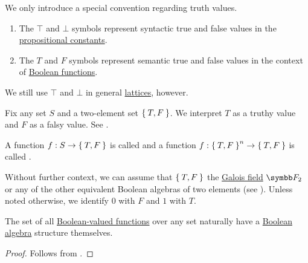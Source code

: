 \begin{remark}
  We only introduce a special convention regarding truth values.
  \begin{enumerate}
    \item The \( \top \) and \( \bot \) symbols represent syntactic true and false values in the \hyperref[def:propositional_alphabet/constants]{propositional constants}.
    \item The \( T \) and \( F \) symbols represent semantic true and false values in the context of \hyperref[def:boolean_function]{Boolean functions}.
  \end{enumerate}

  We still use \( \top \) and \( \bot \) in general \hyperref[def:lattice]{lattices}, however.
\end{remark}

\begin{definition}\label{def:boolean_function}
  Fix any set \( S \) and a two-element set \( \Set{ T, F } \). We interpret \( T \) as a truthy value and \( F \) as a falsy value. See .

  A function \( f: S \to \Set{ T, F } \) is called  and a function \( f: \Set{ T, F }^n \to \Set{ T, F } \) is called .

  Without further context, we can assume that \( \Set{ T, F } \) the \hyperref[thm:galois_field_existence]{Galois field} \( \BF_2 \) or any of the other equivalent Boolean algebras of two elements (see ). Unless noted otherwise, we identify \( 0 \) with \( F \) and \( 1 \) with \( T \).
\end{definition}

\begin{proposition}\label{thm:boolean_functions_form_boolean_algebra}
  The set of all \hyperref[def:boolean_function]{Boolean-valued functions} over any set naturally have a \hyperref[def:boolean_algebra]{Boolean algebra} structure themselves.
\end{proposition}
\begin{proof}
  Follows from .
\end{proof}

